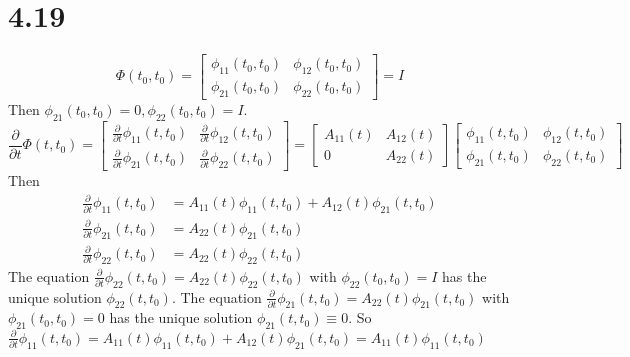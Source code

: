 \documentclass{article}
\begin{document}
\section*{4.19}
$$
\Phi(t_{0},t_{0})=\begin{bmatrix}
\phi_{11}(t_{0},t_{0})&\phi_{12}(t_{0},t_{0})\\
\phi_{21}(t_{0},t_{0})&\phi_{22}(t_{0},t_{0})
\end{bmatrix}=I
$$
Then $\phi_{21}(t_{0},t_{0})=0,\phi_{22}(t_{0},t_{0})=I$.
$$
\frac{\partial }{\partial t}\Phi(t,t_{0})=
\begin{bmatrix}
\frac{\partial }{\partial t}\phi_{11}(t,t_{0})&\frac{\partial }{\partial t}\phi_{12}(t,t_{0})\\
\frac{\partial }{\partial t}\phi_{21}(t,t_{0})&\frac{\partial }{\partial t}\phi_{22}(t,t_{0})
\end{bmatrix}=
\begin{bmatrix}
A_{11}(t)&A_{12}(t)\\
0&A_{22}(t)
\end{bmatrix}
\begin{bmatrix}
\phi_{11}(t,t_{0})&\phi_{12}(t,t_{0})\\
\phi_{21}(t,t_{0})&\phi_{22}(t,t_{0})
\end{bmatrix}
$$
Then
$$
\begin{aligned}
\frac{\partial }{\partial t}\phi_{11}(t,t_{0})&=A_{11}(t)\phi_{11}(t,t_{0})+A_{12}(t)\phi_{21}(t,t_{0})\\
\frac{\partial }{\partial t}\phi_{21}(t,t_{0})&=A_{22}(t)\phi_{21}(t,t_{0})\\
\frac{\partial }{\partial t}\phi_{22}(t,t_{0})&=A_{22}(t)\phi_{22}(t,t_{0})
\end{aligned}
$$
The equation $\frac{\partial }{\partial t}\phi_{22}(t,t_{0})=A_{22}(t)\phi_{22}(t,t_{0})$ with $\phi_{22}(t_{0},t_{0})=I$ has the unique solution $\phi_{22}(t,t_{0})$.
The equation $\frac{\partial }{\partial t}\phi_{21}(t,t_{0})=A_{22}(t)\phi_{21}(t,t_{0})$ with $\phi_{21}(t_{0},t_{0})=0$ has the unique solution $\phi_{21}(t,t_{0})\equiv 0$.
So $\frac{\partial }{\partial t}\phi_{11}(t,t_{0})=A_{11}(t)\phi_{11}(t,t_{0})+
A_{12}(t)\phi_{21}(t,t_{0})=A_{11}(t)\phi_{11}(t,t_{0})$
\end{document}
